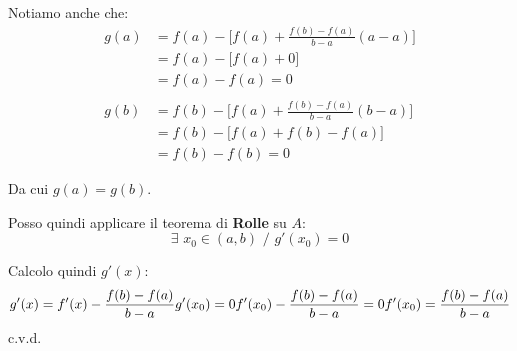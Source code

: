 \documentclass[../dimostrazioni]{subfiles}
\begin{document}
            Notiamo anche che:
            \begin{align*}
                g(a) &= f(a) - \bigg[f(a) + \frac{f(b) - f(a)}{b - a}(a - a) \bigg]\\
                     &= f(a) - \bigg[f(a) + 0 \bigg]\\
                     &= f(a) - f(a) = 0\\
                     \\
                g(b) &= f(b) - \bigg[f(a) + \frac{f(b) - f(a)}{b - a}(b - a) \bigg]\\
                     &= f(b) - \bigg[f(a) + f(b) - f(a) \bigg]\\
                     &= f(b) - f(b) = 0
            \end{align*}
            
            Da cui \( g(a) = g(b) \).

            Posso quindi applicare il teorema di \textbf{Rolle} su \( A \):
            \[
                \exists \, \, x_0 \in (a,b) \, \, / \, \, g'(x_0) = 0
            \]
            
            Calcolo quindi \( g'(x) \):
            \[
                g'(x) = f'(x) - \frac{f(b) - f(a)}{b-a}\\
                \\
                g'(x_0) = 0\\
                \\
                f'(x_0) - \frac{f(b) - f(a)}{b-a} = 0\\
                f'(x_0) = \frac{f(b) - f(a)}{b-a}
            \] c.v.d.
    
\end{document}
